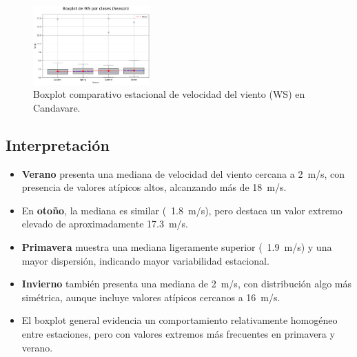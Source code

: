 \vspace{0.2cm}

\begin{figure}[H]
\centering
\includegraphics[width=0.4\textwidth]{resultados/por_estacion_del_anio/boxplot_clases_por_estacion/Candavare/WS_ClassBoxplot_Season.png}
\caption{Boxplot comparativo estacional de velocidad del viento (WS) en Candavare.}
\label{fig:candavare_ws_box}
\end{figure}

\subsection*{Interpretación}

\begin{itemize}
    \item \textbf{Verano} presenta una mediana de velocidad del viento cercana a 2~m/s, con presencia de valores atípicos altos, alcanzando más de 18~m/s.
    \item En \textbf{otoño}, la mediana es similar (~1.8~m/s), pero destaca un valor extremo elevado de aproximadamente 17.3~m/s.
    \item \textbf{Primavera} muestra una mediana ligeramente superior (~1.9~m/s) y una mayor dispersión, indicando mayor variabilidad estacional.
    \item \textbf{Invierno} también presenta una mediana de 2~m/s, con distribución algo más simétrica, aunque incluye valores atípicos cercanos a 16~m/s.
    \item El boxplot general evidencia un comportamiento relativamente homogéneo entre estaciones, pero con valores extremos más frecuentes en primavera y verano.
\end{itemize}
